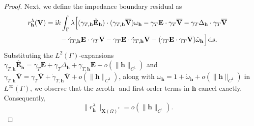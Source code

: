 \documentclass[12pt,reqno]{amsart}
\theoremstyle{definition}
\numberwithin{equation}{section}
\begin{document}
\begin{proof}
Next, we define the impedance boundary residual as
\[
\begin{aligned}
r_{\mathbf{h}}^{\lambda}(\mathbf{V}) &= \mathrm{i}k \int_\Gamma \lambda \Bigl[ (\gamma_{T,\mathbf{h}}\hat{\mathbf{E}}_{\mathbf{h}}) \cdot (\gamma_{T,\mathbf{h}}\overline{\mathbf{V}}) \omega_{\mathbf{h}} - \gamma_T\mathbf{E}\cdot\gamma_T\overline{\mathbf{V}} - \gamma_T\Delta_{\mathbf{h}}\cdot\gamma_T\overline{\mathbf{V}} \\
&\qquad - \dot{\gamma}_{T,\mathbf{h}}\mathbf{E} \cdot \gamma_T\overline{\mathbf{V}} - \gamma_T\mathbf{E} \cdot \dot{\gamma}_{T,\mathbf{h}}\overline{\mathbf{V}} - (\gamma_T\mathbf{E}\cdot\gamma_T\overline{\mathbf{V}}) \dot{\omega}_{\mathbf{h}} \Bigr] \,\mathrm{d}s.
\end{aligned}
\]
Substituting the $L^2(\Gamma)$-expansions $\gamma_{T,\mathbf{h}}\hat{\mathbf{E}}_{\mathbf{h}} = \gamma_T\mathbf{E} + \gamma_T\Delta_{\mathbf{h}} + \dot{\gamma}_{T,\mathbf{h}}\mathbf{E} + o(\|\mathbf{h}\|_{C^1})$ and $\gamma_{T,\mathbf{h}}\overline{\mathbf{V}} = \gamma_T\overline{\mathbf{V}} + \dot{\gamma}_{T,\mathbf{h}}\overline{\mathbf{V}} + o(\|\mathbf{h}\|_{C^1})$, along with $\omega_{\mathbf{h}} = 1 + \dot{\omega}_{\mathbf{h}} + o(\|\mathbf{h}\|_{C^1})$ in $L^\infty(\Gamma)$, we observe that the zeroth- and first-order terms in $\mathbf{h}$ cancel exactly. Consequently, 
\[
\|r_{\mathbf{h}}^{\lambda}\|_{\mathbf{X}(\Omega)^*} = o(\|\mathbf{h}\|_{C^1}).
\]


\end{proof}
\end{document}
